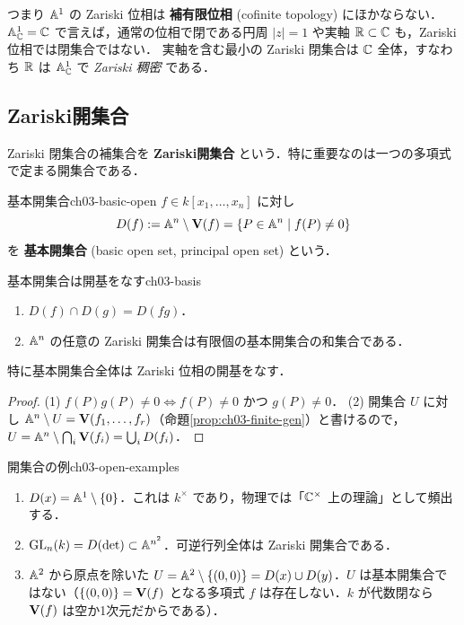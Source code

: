 つまり $\mathbb{A}^1$ の Zariski 位相は \textbf{補有限位相} (cofinite topology) にほかならない．
$\mathbb{A}^1_{\mathbb{C}}=\mathbb{C}$ で言えば，通常の位相で閉である円周 $|z|=1$ や実軸 $\mathbb{R}\subset\mathbb{C}$ も，Zariski 位相では閉集合ではない．
実軸を含む最小の Zariski 閉集合は $\mathbb{C}$ 全体，すなわち $\mathbb{R}$ は $\mathbb{A}^1_{\mathbb{C}}$ で \emph{Zariski 稠密} である．

\subsection{Zariski開集合}

Zariski 閉集合の補集合を \textbf{Zariski開集合} という．特に重要なのは一つの多項式で定まる開集合である．

\begin{mydef}{基本開集合}{ch03-basic-open}
$f\in k[x_1,\dots,x_n]$ に対し
\[
  D(f):=\mathbb{A}^n\setminus\mathbf{V}(f)=\{P\in\mathbb{A}^n\mid f(P)\ne0\}
\]
を \textbf{基本開集合} (basic open set, principal open set) という．
\end{mydef}

\begin{myprop}{基本開集合は開基をなす}{ch03-basis}
\begin{enumerate}
  \item $D(f)\cap D(g)=D(fg)$．
  \item $\mathbb{A}^n$ の任意の Zariski 開集合は有限個の基本開集合の和集合である．
\end{enumerate}
特に基本開集合全体は Zariski 位相の開基をなす．
\end{myprop}

\begin{proof}
(1) $f(P)g(P)\ne0\iff f(P)\ne0$ かつ $g(P)\ne0$．
(2) 開集合 $U$ に対し $\mathbb{A}^n\setminus U=\mathbf{V}(f_1,\dots,f_r)$（命題\ref{prop:ch03-finite-gen}）と書けるので，
$U=\mathbb{A}^n\setminus\bigcap_i\mathbf{V}(f_i)=\bigcup_i D(f_i)$．
\end{proof}

\begin{myex}{開集合の例}{ch03-open-examples}
\begin{enumerate}
  \item $D(x)=\mathbb{A}^1\setminus\{0\}$．これは $k^\times$ であり，物理では「$\mathbb{C}^\times$ 上の理論」として頻出する．
  \item $\operatorname{GL}_n(k)=D(\det)\subset\mathbb{A}^{n^2}$．可逆行列全体は Zariski 開集合である．
  \item $\mathbb{A}^2$ から原点を除いた $U=\mathbb{A}^2\setminus\{(0,0)\}=D(x)\cup D(y)$．$U$ は基本開集合ではない（$\{(0,0)\}=\mathbf{V}(f)$ となる多項式 $f$ は存在しない．$k$ が代数閉なら $\mathbf{V}(f)$ は空か1次元だからである）．
\end{enumerate}
\end{myex}

